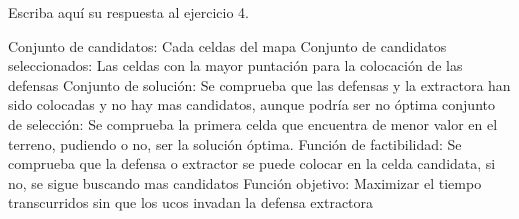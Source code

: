 Escriba aquí su respuesta al ejercicio 4.

Conjunto de candidatos: Cada celdas del mapa
Conjunto de candidatos seleccionados: Las celdas con la mayor puntación para la colocación de las defensas
Conjunto de solución: Se comprueba que las defensas y la extractora han sido colocadas y no hay mas candidatos, aunque podría ser no óptima
conjunto de selección: Se comprueba la primera celda que encuentra de menor valor en el terreno, pudiendo o no, ser la solución óptima.
Función de factibilidad: Se comprueba que la defensa o extractor se puede colocar en la celda candidata, si no, se sigue buscando mas candidatos
Función objetivo: Maximizar el tiempo transcurridos sin que los ucos invadan la defensa extractora

